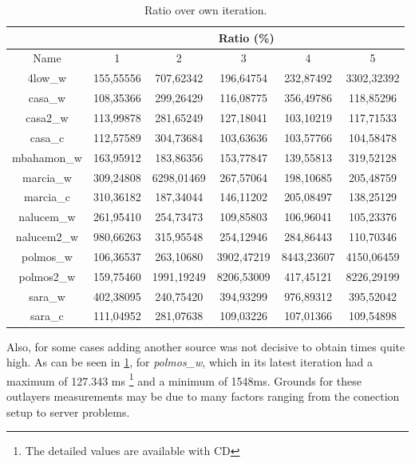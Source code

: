 \begin{table}[!ht]
\begin{center}
\begin{tabular}{|c||c|c|c|c|c||}
 \hline
 & \multicolumn{5}{|c|}{ Ratio (\%)} \\ \hline
Name 		& 1			& 2			 & 3	        & 4				& 5 			\\ \hline \hline
4low\_w		& 155,55556	& 707,62342	 & 196,64754	& 232,87492		& 3302,32392	\\ \hline
casa\_w		& 108,35366	& 299,26429	 & 116,08775	& 356,49786		& 118,85296 	\\ \hline
casa2\_w	& 113,99878	& 281,65249	 & 127,18041	& 103,10219		& 117,71533 	\\ \hline
casa\_c		& 112,57589	& 304,73684	 & 103,63636	& 103,57766		& 104,58478 	\\ \hline
mbahamon\_w	& 163,95912	& 183,86356	 & 153,77847	& 139,55813		& 319,52128 	\\ \hline
marcia\_w	& 309,24808	& 6298,01469 & 267,57064	& 198,10685		& 205,48759 	\\ \hline
marcia\_c	& 310,36182	& 187,34044	 & 146,11202	& 205,08497		& 138,25129 	\\ \hline
nalucem\_w	& 261,95410	& 254,73473	 & 109,85803	& 106,96041		& 105,23376 	\\ \hline
nalucem2\_w	& 980,66263	& 315,95548	 & 254,12946	& 284,86443		& 110,70346 	\\ \hline
polmos\_w	& 106,36537	& 263,10680	 & 3902,47219	& 8443,23607	& 4150,06459 	\\ \hline
polmos2\_w	& 159,75460	& 1991,19249 & 8206,53009	& 417,45121		& 8226,29199 	\\ \hline
sara\_w		& 402,38095	& 240,75420	 & 394,93299	& 976,89312		& 395,52042 	\\ \hline
sara\_c		& 111,04952	& 281,07638	 & 109,03226	& 107,01366		& 109,54898 	\\ \hline
\end{tabular}
\caption[Page Benchmark: Ratio over own iteration]{Ratio over own iteration.}
\label{table:variationratio}
\end{center}
\end{table}

Also, for some cases adding another source was not decisive to obtain times
quite high. As can be seen in \ref{table:variationratio}, for
\emph{polmos\_w}, which in its latest iteration had a maximum of 127.343 ms
\footnote{The detailed values are available with CD} and a minimum of 1548ms.
Grounds for these outlayers measurements may be due to many factors ranging
from the conection setup to server problems.
